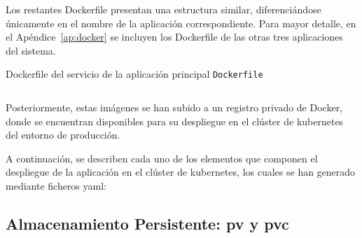 Los restantes Dockerfile presentan una estructura similar, diferenciándose únicamente en el nombre de la aplicación correspondiente. Para mayor detalle, en el Apéndice~\ref{ap:docker} se incluyen los Dockerfile de las otras tres aplicaciones del sistema.
\begin{longlisting}
\caption{Dockerfile del servicio de la aplicación principal {\tt Dockerfile}}
\inputminted{docker}{../backend/despliegue/elrincondeeva/Dockerfile}
\label{lst:dockerfile}
\end{longlisting}

Posteriormente, estas imágenes se han subido a un registro privado de Docker, donde se encuentran disponibles para su despliegue en el clúster de \gls{kubernetes} del entorno de producción. 

A continuación, se describen cada uno de los elementos que componen el despliegue de la aplicación en el clúster de \gls{kubernetes}, los cuales se han generado mediante ficheros \gls{yaml}:

\subsection{Almacenamiento Persistente: \gls{pv} y \gls{pvc}}

